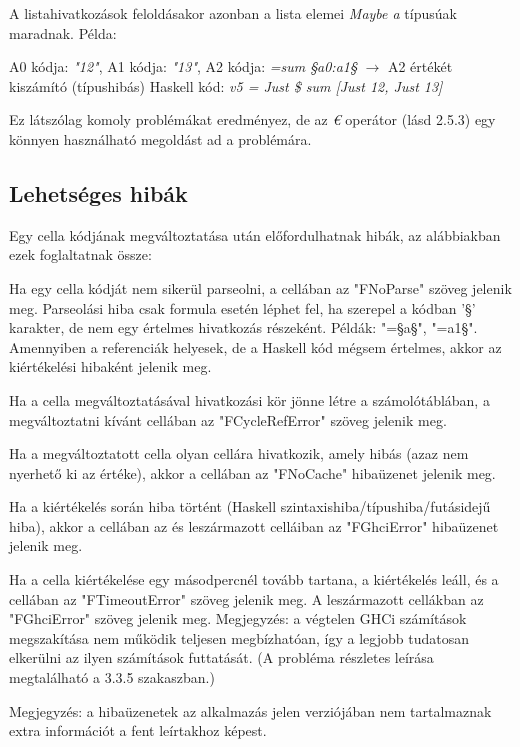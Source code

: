 A listahivatkozások feloldásakor azonban a lista elemei \textit{Maybe a} típusúak maradnak. Példa:

A0 kódja: \textit{"12"}, A1 kódja: \textit{"13"}, A2 kódja: \textit{=sum §a0:a1§} $\rightarrow$ A2 értékét kiszámító (típushibás) Haskell kód: \textit{v5 = Just \$ sum [Just 12, Just 13]}

Ez látszólag komoly problémákat eredményez, de az \textit{€} operátor (lásd 2.5.3) egy könnyen használható megoldást ad a problémára.

\subsection{Lehetséges hibák}

Egy cella kódjának megváltoztatása után előfordulhatnak hibák, az alábbiakban ezek foglaltatnak össze:
\begin{compactenum}
	\item Ha egy cella kódját nem sikerül parseolni, a cellában az "FNoParse" szöveg jelenik meg. Parseolási hiba csak formula esetén léphet fel, ha szerepel a kódban '§' karakter, de nem egy értelmes hivatkozás részeként. Példák: "=§a§", "=a1§". Amennyiben a referenciák helyesek, de a Haskell kód mégsem értelmes, akkor az kiértékelési hibaként jelenik meg.
	\item Ha a cella megváltoztatásával hivatkozási kör jönne létre a számolótáblában, a megváltoztatni kívánt cellában az "FCycleRefError" szöveg jelenik meg.
	\item Ha a megváltoztatott cella olyan cellára hivatkozik, amely hibás (azaz nem nyerhető ki az értéke), akkor a cellában az "FNoCache" hibaüzenet jelenik meg. 
	\item Ha a kiértékelés során hiba történt (Haskell szintaxishiba/típushiba/futásidejű hiba), akkor a cellában az és leszármazott celláiban az "FGhciError" hibaüzenet jelenik meg.
	\item Ha a cella kiértékelése egy másodpercnél tovább tartana, a kiértékelés leáll, és a cellában az "FTimeoutError" szöveg jelenik meg. A leszármazott cellákban az "FGhciError" szöveg jelenik meg. Megjegyzés: a végtelen GHCi számítások megszakítása nem működik teljesen megbízhatóan, így a legjobb tudatosan elkerülni az ilyen számítások futtatását. (A probléma részletes leírása megtalálható a 3.3.5 szakaszban.)
\end{compactenum}
	
Megjegyzés: a hibaüzenetek az alkalmazás jelen verziójában nem tartalmaznak extra információt a fent leírtakhoz képest. 


